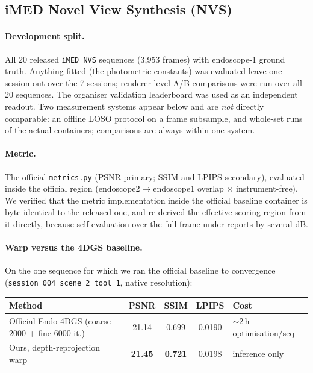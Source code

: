 \subsection{iMED Novel View Synthesis (NVS)}

\paragraph{Development split.} All 20 released \texttt{iMED\_NVS} sequences (3{,}953 frames) with
endoscope-1 ground truth. Anything fitted (the photometric constants) was evaluated leave-one-session-out
over the 7 sessions; renderer-level A/B comparisons were run over all 20 sequences. The organiser
validation leaderboard was used as an independent readout. Two measurement systems appear below and are
\emph{not} directly comparable: an offline LOSO protocol on a frame subsample, and whole-set runs of the
actual containers; comparisons are always within one system.

\paragraph{Metric.} The official \texttt{metrics.py} (PSNR primary; SSIM and LPIPS secondary), evaluated
inside the official region (endoscope2$\rightarrow$endoscope1 overlap $\times$ instrument-free). We
verified that the metric implementation inside the official baseline container is byte-identical to the
released one, and re-derived the effective scoring region from it directly, because self-evaluation over
the full frame under-reports by several dB.

\paragraph{Warp versus the 4DGS baseline.} On the one sequence for which we ran the official baseline to
convergence (\texttt{session\_004\_scene\_2\_tool\_1}, native resolution):

\begin{center}
\begin{tabular}{lcccl}
\toprule
Method & PSNR & SSIM & LPIPS & Cost \\
\midrule
Official Endo-4DGS (coarse 2000 + fine 6000 it.) & 21.14 & 0.699 & 0.0190 & $\sim$2\,h optimisation/seq \\
Ours, depth-reprojection warp                    & \textbf{21.45} & \textbf{0.721} & 0.0198 & inference only \\
\bottomrule
\end{tabular}
\end{center}

